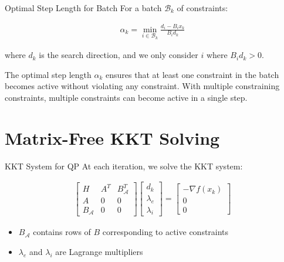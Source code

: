 \documentclass{beamer}
\begin{document}
\begin{frame}{Optimal Step Length for Batch}
    For a batch $\mathcal{B}_k$ of constraints:
    
    \begin{align}
        \alpha_k = \min_{i \in \mathcal{B}_k} \frac{d_i - B_i x_k}{B_i d_k}
    \end{align}
    
    where $d_k$ is the search direction, and we only consider $i$ where $B_i d_k > 0$.
    
    \begin{theorem}
        The optimal step length $\alpha_k$ ensures that at least one constraint in the batch becomes active without violating any constraint. With multiple constraining constraints, multiple constraints can become active in a single step.
    \end{theorem}
\end{frame}

\section{Matrix-Free KKT Solving}

\begin{frame}{KKT System for QP}
    At each iteration, we solve the KKT system:
    
    \begin{align}
        \begin{bmatrix}
            H & A^T & B_{\mathcal{A}}^T \\
            A & 0 & 0 \\
            B_{\mathcal{A}} & 0 & 0
        \end{bmatrix}
        \begin{bmatrix}
            d_k \\
            \lambda_e \\
            \lambda_i
        \end{bmatrix} =
        \begin{bmatrix}
            -\nabla f(x_k) \\
            0 \\
            0
        \end{bmatrix}
    \end{align}
    
    \begin{itemize}
        \item $B_{\mathcal{A}}$ contains rows of $B$ corresponding to active constraints
        \item $\lambda_e$ and $\lambda_i$ are Lagrange multipliers
    \end{itemize}
\end{frame}
\end{document}
